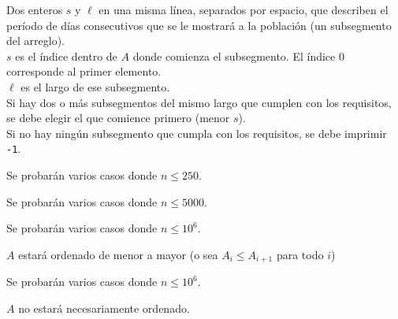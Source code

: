 \documentclass{oci}
\begin{document}
\begin{outputDescription}
\noindent Dos enteros $s$ y $\ell$ en una misma línea, separados por espacio, que describen el período de días consecutivos que se le mostrará a la población (un subsegmento del arreglo).\\

\noindent $s$ es el índice dentro de $A$ donde comienza el subsegmento. El índice $0$ corresponde al primer elemento.\\

\noindent $\ell$ es el largo de ese subsegmento.\\

\noindent Si hay dos o más subsegmentos del mismo largo que cumplen con los requisitos, se debe elegir el que comience primero (menor $s$).\\

\noindent Si no hay ningún subsegmento que cumpla con los requisitos, se debe imprimir \texttt{-1}.\\
\end{outputDescription}

\begin{scoreDescription}
  Se probarán varios casos donde $n \le 250$.
 
  Se probarán varios casos donde $n \le 5000$.
 
  Se probarán varios casos donde $n \le 10^6$.
  
  $A$ estará ordenado de menor a mayor (o sea $A_i \le A_{i+1}$ para todo $i$)
 
  Se probarán varios casos donde $n \le 10^6$.
  
  $A$ no estará necesariamente ordenado.
\end{scoreDescription}

\begin{sampleDescription}
\end{sampleDescription}
\end{document}

